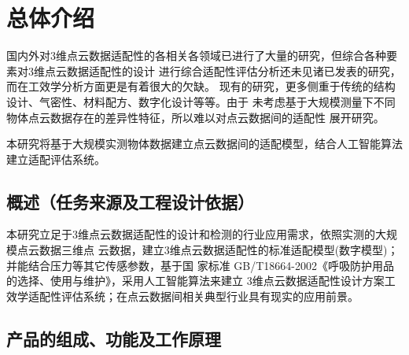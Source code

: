 \documentclass[a4paper,12pt]{ctexbook}	%
\begin{document}





\tableofcontents

\thispagestyle{empty}

\mainmatter		%


\setcounter{page}{1}
\chapter{总体介绍}

国内外对3维点云数据适配性的各相关各领域已进行了大量的研究，但综合各种要素对3维点云数据适配性的设计
进行综合适配性评估分析还未见诸已发表的研究，而在工效学分析方面更是有着很大的欠缺。
现有的研究，更多侧重于传统的结构设计、气密性、材料配方、数字化设计等等。由于
未考虑基于大规模测量下不同物体点云数据存在的差异性特征，所以难以对点云数据间的适配性
展开研究。

{\heiti
本研究将基于大规模实测物体数据建立点云数据间的适配模型，结合人工智能算法建立适配评估系统。
}

\section{概述（任务来源及工程设计依据）}

本研究立足于3维点云数据适配性的设计和检测的行业应用需求，依照实测的大规模点云数据三维点
云数据，建立3维点云数据适配性的标准适配模型(数字模型)；并能结合压力等其它传感参数，基于国
家标准 GB/T18664-2002《呼吸防护用品的选择、使用与维护》，采用人工智能算法来建立
3维点云数据适配性设计方案工效学适配性评估系统；在点云数据间相关典型行业具有现实的应用前景。

\section{产品的组成、功能及工作原理}
\end{document}
